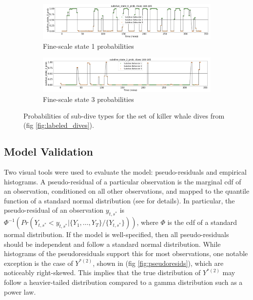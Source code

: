 \begin{figure}[ht]
	\centering
	\begin{subfigure}[t]{1.0\textwidth}
        \centering
        \includegraphics[width=5in]{../Plots/Fine_state_probs_1.png}
        \caption{Fine-scale state 1 probabilities}
    \end{subfigure}
    \newline
    \begin{subfigure}[t]{1.0\textwidth}
        \centering
        \includegraphics[width=5in]{../Plots/Fine_state_probs_3.png}
        \caption{Fine-scale state 3 probabilities}
    \end{subfigure}
	\caption{Probabilities of sub-dive types for the set of killer whale dives from (fig \ref{fig:labeled_dives}).}
	\label{fig:fine_probs}
\end{figure}

\subsection{Model Validation}
\label{subsec:model_validation}

Two visual tools were used to evaluate the model: pseudo-residuals and empirical histograms. A pseudo-residual of a particular observation is the marginal cdf of an observation, conditioned on all other observations, and mapped to the quantile function of a standard normal distribution (see \citep{Zucchini:2016} for details). In particular, the pseudo-residual of an observation $y_{t,s^*}$ is $\Phi^{-1} \left(Pr(Y_{t,s^*} < y_{t,s^*}|\{Y_1,\ldots,Y_T\}/\{Y_{t,s^*}\}) \right)$, where $\Phi$ is the cdf of a standard normal distribution. If the model is well-specified, then all pseudo-residuals should be independent and follow a standard normal distribution. While histograms of the pseudoresiduals support this for most observations, one notable exception is the case of $Y^{*(2)}$, shown in (fig \ref{fig:pseudoresids}), which are noticeably right-skewed. This implies that the true distribution of $Y^{*(2)}$ may follow a heavier-tailed distribution compared to a gamma distribution such as a power law. 

